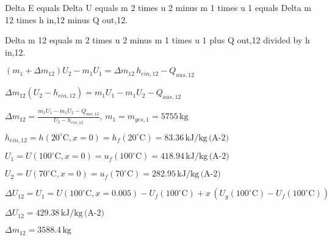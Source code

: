 Delta E equals Delta U equals m 2 times u 2 minus m 1 times u 1 equals Delta m 12 times h in,12 minus Q out,12.  

Delta m 12 equals m 2 times u 2 minus m 1 times u 1 plus Q out,12 divided by h in,12.

\((m_1 + \Delta m_{12}) U_2 - m_1 U_1 = \Delta m_{12} \, h_{ein,12} - Q_{aus,12}\)  

\(\Delta m_{12} (U_2 - h_{ein,12}) = m_1 U_1 - m_1 U_2 - Q_{aus,12}\)  

\(\Delta m_{12} = \frac{m_1 U_1 - m_1 U_2 - Q_{aus,12}}{U_2 - h_{ein,12}}\), \(m_1 = m_{ges,1} = 5755 \, \text{kg}\)  

\(h_{ein,12} = h(20^\circ \text{C}, x = 0) = h_f(20^\circ \text{C}) = 83.36 \, \text{kJ/kg} \, \text{(A-2)}\)  

\(U_1 = U(100^\circ \text{C}, x = 0) = u_f(100^\circ \text{C}) = 418.94 \, \text{kJ/kg} \, \text{(A-2)}\)  

\(U_2 = U(70^\circ \text{C}, x = 0) = u_f(70^\circ \text{C}) = 282.95 \, \text{kJ/kg} \, \text{(A-2)}\)  

\(\Delta U_{12} = U_1 = U(100^\circ \text{C}, x = 0.005) - U_f(100^\circ \text{C}) + x \, (U_g(100^\circ \text{C}) - U_f(100^\circ \text{C}))\)  

\(\Delta U_{12} = 429.38 \, \text{kJ/kg} \, \text{(A-2)}\)  

\(\Delta m_{12} = 3588.4 \, \text{kg}\)